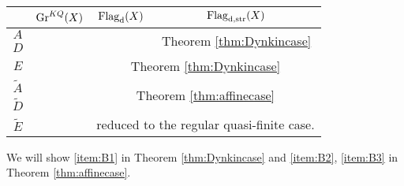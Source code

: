 \begingroup
\renewcommand{\arraystretch}{1.3}
\begin{table}[ht]
\centering
\vspace{0.5cm}
\begin{tabular}{|c|c|c|c|}
\hline
            & $\operatorname{Gr}^{KQ}(X)$                  & $\operatorname{\operatorname{Flag}_{d}}(X)$                          & $\operatorname{\operatorname{Flag}_{d,\operatorname{str}}}(X)$          \\ \hline
$A$         & \multirow{3}{*}{\cite[Section 5]{irelli2019cell}} & \multirow{2}{*}{\cite[Theorem 2.20]{maksimau2019flag}}        & \multirow{2}{*}{Theorem \ref{thm:Dynkincase}}       \\ \cline{1-1}
$D$         &                            &                                      &                         \\ \cline{1-1} \cline{3-4} 
$E$         &                            & \multicolumn{2}{c|}{Theorem \ref{thm:Dynkincase}}                                          \\ \hline
$\tilde{A}$ & \multirow{3}{*}{\cite[Section 6]{irelli2019cell}} & \multicolumn{2}{c|}{\multirow{2}{*}{Theorem \ref{thm:affinecase}}}                         \\ \cline{1-1}
$\tilde{D}$ &                            & \multicolumn{2}{c|}{}                                          \\ \cline{1-1} \cline{3-4} 
$\tilde{E}$ &                            & \multicolumn{2}{c|}{reduced to the regular quasi-finite case.} \\ \hline
\end{tabular}
\vspace{1mm}
\caption{}\label{table:result}
\end{table}
\endgroup
We will show \eqref{item:B1} in Theorem \ref{thm:Dynkincase} and \eqref{item:B2}, \eqref{item:B3} in Theorem \ref{thm:affinecase}.

$\,$

